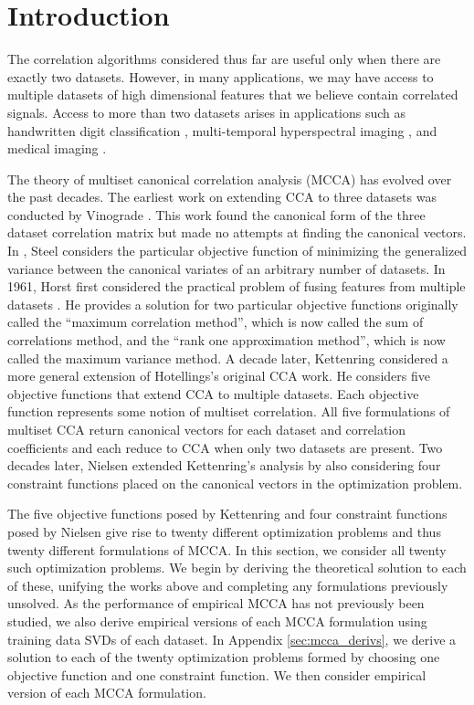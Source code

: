\section{Introduction}
 The correlation algorithms considered thus far are useful only when there are exactly two
datasets.  However, in many applications, we may have access to multiple datasets of high
dimensional features that we believe contain correlated signals. Access to more
than two datasets arises in applications such as handwritten digit classification
\cite{yu2007learning}, multi-temporal hyperspectral imaging \cite{nielsen2002multiset},
and medical imaging \cite{correa2010canonical, deleus2011functional}.

The theory of multiset canonical correlation analysis (MCCA) has evolved over the past
decades. The earliest work on extending CCA to three datasets was conducted by Vinograde
\cite{vinograde1950canonical}. This work found the canonical form of the three dataset
correlation matrix but made no attempts at finding the canonical vectors. In
\cite{steel1951minimum}, Steel considers the particular objective function of minimizing
the generalized variance between the canonical variates of an arbitrary number of
datasets. In 1961, Horst first considered the practical problem of fusing features from
multiple datasets \cite{horst1961relations,horst1961generalized}. He provides a solution
for two particular objective functions originally called the ``maximum correlation
method'', which is now called the sum of correlations method, and the ``rank one
approximation method'', which is now called the maximum variance method. A decade later,
Kettenring \cite{kettenring1971canonical} considered a more general extension of
Hotellings's \cite{hotelling1936relations} original CCA work. He considers five objective
functions that extend CCA to multiple datasets. Each objective function represents
some notion of multiset correlation. All five formulations of multiset CCA return canonical
vectors for each dataset and correlation coefficients and each reduce to CCA when only
two datasets are present. Two decades later, Nielsen \cite{nielsen1994analysis} extended
Kettenring's analysis by also considering four constraint functions placed on the
canonical vectors in the optimization problem.

The five objective functions posed by Kettenring and four constraint functions posed by
Nielsen give rise to twenty different optimization problems and thus twenty different
formulations of MCCA. In this section, we consider all twenty such optimization
problems. We begin by deriving the theoretical solution to each of these, unifying the
works above and completing any formulations previously unsolved. As the performance of
empirical MCCA has not previously been studied, we also derive empirical versions of each
MCCA formulation using training data SVDs of each dataset. In Appendix
\ref{sec:mcca_derivs}, we derive a solution to each of the twenty optimization problems
formed by choosing one objective function and one constraint function. We then consider
empirical version of each MCCA formulation.

